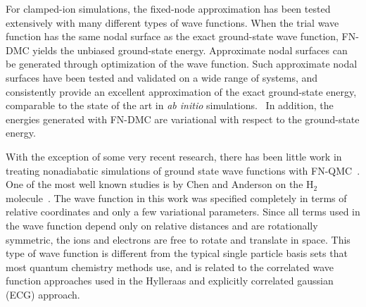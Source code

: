 \documentclass[aip,jcp,numerical,reprint]{revtex4-1}
\begin{document}
For clamped-ion simulations, the fixed-node approximation has been tested extensively with many different types of wave functions.  When the trial wave function has the same nodal surface as the exact ground-state wave function, FN-DMC yields the unbiased ground-state energy.  Approximate nodal surfaces can be generated through optimization of the wave function. Such approximate nodal surfaces have been tested and validated on a wide range of systems, and consistently provide an excellent approximation of the exact ground-state energy, comparable to the state of the art in \textit{ab initio} simulations.~\cite{Stuart_Review,rothstein1,grossman1,Yang2015,Tubman_Release} In addition, the energies generated with FN-DMC are variational with respect to the ground-state energy.


With the exception of some very recent research, there has been little work in treating nonadiabatic simulations of ground state wave functions with FN-QMC~\cite{Tubman_ECG,Yang2015}.  One of the most well known studies is by Chen and Anderson   on  the H$_{2}$ molecule~\cite{chen1995}.  The wave function in this work was specified completely in terms of relative coordinates and only a few variational parameters.  
Since all terms used in the wave function depend only on relative distances and are rotationally symmetric, the ions and electrons are free to rotate and translate in space.   This type of wave function is different from the typical single particle basis sets that most quantum chemistry methods use, and is related to the correlated wave function approaches used in the Hylleraas and explicitly correlated gaussian (ECG) approach.  
\end{document}
